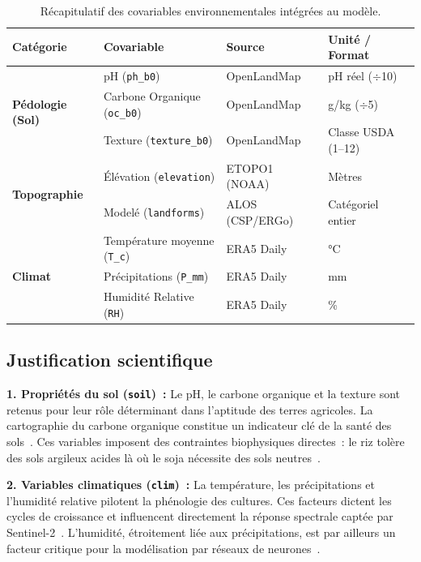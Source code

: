 \begin{table}[H]
\centering
\small
\begin{tabular}{|l|l|l|l|}
\hline
\textbf{Catégorie} & \textbf{Covariable} & \textbf{Source} & \textbf{Unité / Format} \\ \hline
\multirow{3}{*}{\textbf{Pédologie (Sol)}}
  & pH (\texttt{ph\_b0})               & OpenLandMap & pH réel ($\div$10) \\ \cline{2-4}
  & Carbone Organique (\texttt{oc\_b0}) & OpenLandMap & g/kg ($\div$5)     \\ \cline{2-4}
  & Texture (\texttt{texture\_b0})      & OpenLandMap & Classe USDA (1--12) \\ \hline
\multirow{2}{*}{\textbf{Topographie}}
  & Élévation (\texttt{elevation})      & ETOPO1 (NOAA) & Mètres \\ \cline{2-4}
  & Modelé (\texttt{landforms})         & ALOS (CSP/ERGo) & Catégoriel entier \\ \hline
\multirow{3}{*}{\textbf{Climat}}
  & Température moyenne (\texttt{T\_c}) & ERA5 Daily & °C \\ \cline{2-4}
  & Précipitations (\texttt{P\_mm})     & ERA5 Daily & mm \\ \cline{2-4}
  & Humidité Relative (\texttt{RH})     & ERA5 Daily & \% \\ \hline
\end{tabular}
\caption{Récapitulatif des covariables environnementales intégrées au modèle.}
\label{tab:covariables}
\end{table}

\subsection{Justification scientifique}

\textbf{1. Propriétés du sol (\texttt{soil})~:} Le pH, le carbone organique et la
texture sont retenus pour leur rôle déterminant dans l'aptitude des terres agricoles.
La cartographie du carbone organique constitue un indicateur clé de la santé des
sols~\cite{ou2024}. Ces variables imposent des contraintes biophysiques directes~:
le riz tolère des sols argileux acides là où le soja nécessite des sols neutres~\cite{tufail2025}.

\textbf{2. Variables climatiques (\texttt{clim})~:} La température, les précipitations
et l'humidité relative pilotent la phénologie des cultures. Ces facteurs dictent les
cycles de croissance et influencent directement la réponse spectrale captée par
Sentinel-2~\cite{wang2024}. L'humidité, étroitement liée aux précipitations, est
par ailleurs un facteur critique pour la modélisation par réseaux de neurones~\cite{jiao2025}.

